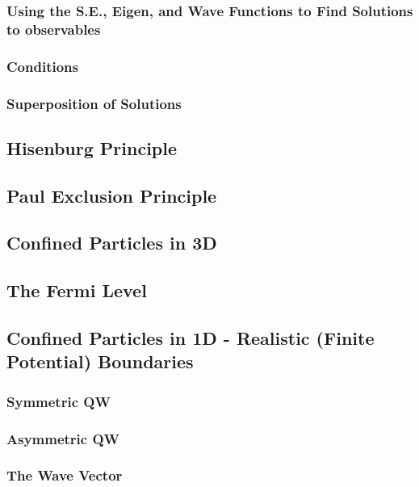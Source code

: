 \documentclass[colorlinks,11pt,a4paper,normalphoto,withhyper,ragged2e]{altareport}
\begin{document}
		
		\subsubsection{Using the S.E., Eigen, and Wave Functions to Find Solutions to observables}
		
		
		\subsubsection{Conditions}
		
		
		\subsubsection{Superposition of Solutions}
		
		
	\subsection{Hisenburg Principle}
	
	
	\subsection{Paul Exclusion Principle}
	
	
	\subsection{Confined Particles in 3D}
	
	
	\subsection{The Fermi Level}
	
	
	\subsection{Confined Particles in 1D - Realistic (Finite Potential) Boundaries}
	
		\subsubsection{Symmetric QW}
		
		
		\subsubsection{Asymmetric QW}
		
		
		\subsubsection{The Wave Vector}
		
\end{document}
